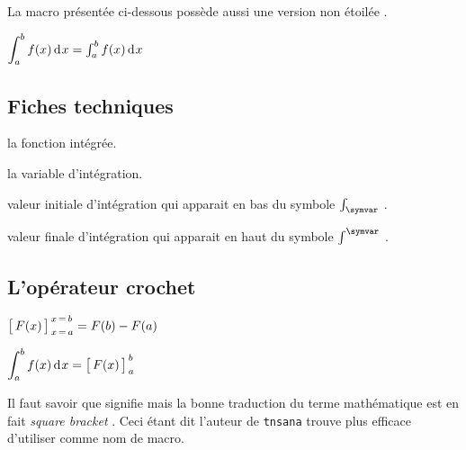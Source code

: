 \documentclass[12pt,a4paper]{article}
\begin{document}

La macro  présentée ci-dessous possède aussi une version non étoilée .

\begin{latexex}
 $\dintegrate*{f(x)}{x}{a}{b}
= \integrate*{f(x)}{x}{a}{b}$
\end{latexex}




\subsection{Fiches techniques}



\extraspace

 \hfill {}

 \hfill {}


 la fonction intégrée.

 la variable d'intégration.

 valeur initiale d'intégration qui apparait en bas du symbole $\int_{\symvar}$ .

 valeur finale d'intégration qui apparait en haut du symbole $\int^{\symvar}$ .





\subsection{L'opérateur \og crochet \fg}

\newparaexample{}

\begin{latexex}
 $\hook{F(x)}{x}{a}{b}
= F(b) - F(a)$

 $\dintegrate*{f(x)}{x}{a}{b}
= \hook*{F(x)}{x}{a}{b}$

\end{latexex}


\begin{remark}
	Il faut savoir que  signifie  mais la bonne traduction du terme mathématique est en fait \emph{\og square bracket \fg}. Ceci étant dit l'auteur de \verb+tnsana+ trouve plus efficace d'utiliser  comme nom de macro.
\end{remark}
\end{document}
